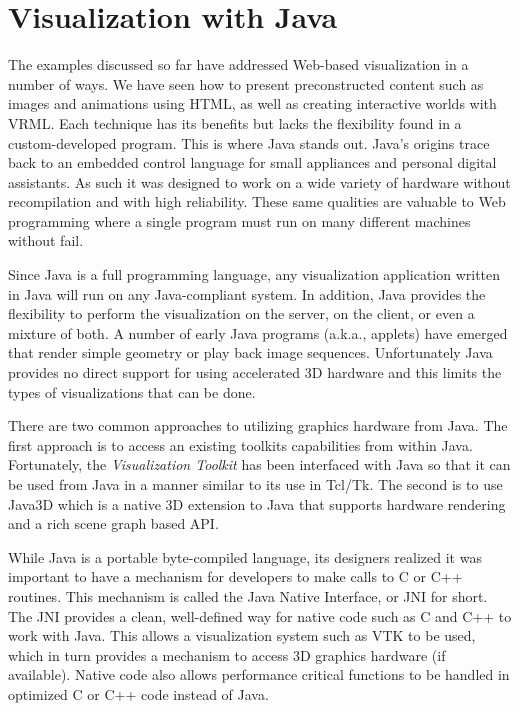 \section{Visualization with Java}

The examples discussed so far have addressed Web-based visualization in a number of ways. We have seen how to present preconstructed content such as images and animations using HTML, as well as creating interactive worlds with VRML. Each technique has its benefits but lacks the flexibility found in a custom-developed program. This is where Java stands out. Java’s origins trace back to an embedded control language for small appliances and personal digital assistants. As such it was designed to work on a wide variety of hardware without recompilation and with high reliability. These same qualities are valuable to Web programming where a single program must run on many different machines without fail.

Since Java is a full programming language, any visualization application written in Java will run on any Java-compliant system. In addition, Java provides the flexibility to perform the visualization on the server, on the client, or even a mixture of both. A number of early Java programs (a.k.a., applets) have emerged that render simple geometry or play back image sequences. Unfortunately Java provides no direct support for using accelerated 3D hardware and this limits the types of visualizations that can be done.

There are two common approaches to utilizing graphics hardware from Java. The first approach is to access an existing toolkits capabilities from within Java. Fortunately, the \emph{Visualization Toolkit} has been interfaced with Java so that it can be used from Java in a manner similar to its use in Tcl/Tk. The second is to use Java3D which is a native 3D extension to Java that supports hardware rendering and a rich scene graph based API.

While Java is a portable byte-compiled language, its designers realized it was important to have a mechanism for developers to make calls to C or C++ routines. This mechanism is called the Java Native Interface, or JNI for short. The JNI provides a clean, well-defined way for native code such as C and C++ to work with Java. This allows a visualization system such as VTK to be used, which in turn provides a mechanism to access 3D graphics hardware (if available). Native code also allows performance critical functions to be handled in optimized C or C++ code instead of Java.

